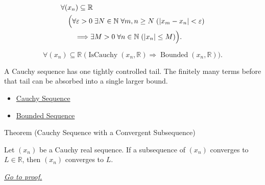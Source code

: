 \begin{remark*}
\[
\begin{aligned}
&\forall (x_n)\subseteq\mathbb{R}\\
&\quad
\Bigl(
  \forall \varepsilon>0\;\exists N\in\mathbb{N}\;\forall m,n\ge N
  \;( |x_m-x_n|<\varepsilon )\\
&\qquad\Longrightarrow
  \exists M>0\;\forall n\in\mathbb{N}\;( |x_n|\le M )
\Bigr).
\end{aligned}
\]
\end{remark*}

\begin{remark*}
\[
\forall (x_n)\subseteq\mathbb{R}\;
\bigl(
  \operatorname{IsCauchy}(x_n,\mathbb{R})
  \Longrightarrow
  \operatorname{Bounded}(x_n,\mathbb{R})
\bigr).
\]
\end{remark*}

\begin{remark*}[Interpretation]
A Cauchy sequence has one tightly controlled tail. The finitely many terms
before that tail can be absorbed into a single larger bound.
\end{remark*}

\begin{dependencies}
\begin{itemize}
  \item \hyperref[def:cauchy-sequence]{Cauchy Sequence}
  \item \hyperref[def:bounded-sequence]{Bounded Sequence}
\end{itemize}
\end{dependencies}


\begin{theorembox}{Theorem (Cauchy Sequence with a Convergent Subsequence)}
\begin{theorem}
\label{thm:cauchy-convergent-subsequence-converges}
Let $(x_n)$ be a Cauchy real sequence. If a subsequence of $(x_n)$
converges to $L\in\mathbb{R}$, then $(x_n)$ converges to $L$.

\smallskip
\noindent
\hyperref[prf:cauchy-convergent-subsequence-converges]{\textit{Go to proof.}}
\end{theorem}
\end{theorembox}

